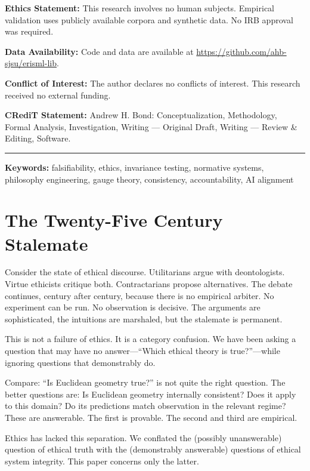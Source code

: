 \documentclass[12pt]{article}
\begin{document}
\begin{titlepage}
\noindent\textbf{Ethics Statement:} This research involves no human subjects. Empirical validation uses publicly available corpora and synthetic data. No IRB approval was required.

\noindent\textbf{Data Availability:} Code and data are available at \url{https://github.com/ahb-sjsu/erisml-lib}.

\noindent\textbf{Conflict of Interest:} The author declares no conflicts of interest. This research received no external funding.

\noindent\textbf{CRediT Statement:} Andrew H. Bond: Conceptualization, Methodology, Formal Analysis, Investigation, Writing --- Original Draft, Writing --- Review \& Editing, Software.
\noindent\rule{\linewidth}{0.4pt}
\normalsize

\end{titlepage}

\noindent\textbf{Keywords:} falsifiability, ethics, invariance testing, normative systems,
philosophy engineering, gauge theory, consistency, accountability, AI alignment

\section{The Twenty-Five Century Stalemate}

Consider the state of ethical discourse. Utilitarians argue with deontologists. Virtue
ethicists critique both. Contractarians propose alternatives. The debate continues,
century after century, because there is no empirical arbiter. No experiment can be
run. No observation is decisive. The arguments are sophisticated, the intuitions are
marshaled, but the stalemate is permanent.

This is not a failure of ethics. It is a category confusion. We have been asking a
question that may have no answer---``Which ethical theory is true?''---while ignoring
questions that demonstrably do.

Compare: ``Is Euclidean geometry true?'' is not quite the right question. The better
questions are: Is Euclidean geometry internally consistent? Does it apply to this
domain? Do its predictions match observation in the relevant regime? These are
answerable. The first is provable. The second and third are empirical.

Ethics has lacked this separation. We conflated the (possibly unanswerable) question
of ethical truth with the (demonstrably answerable) questions of ethical system
integrity. This paper concerns only the latter.
\end{document}
